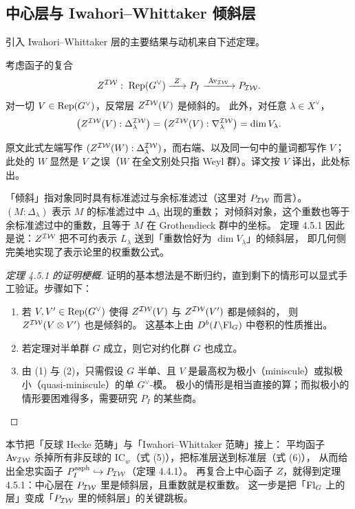 \subsection{中心层与 Iwahori–Whittaker 倾斜层}\label{sec:tilt}

引入 Iwahori–Whittaker 层的主要结果与动机来自下述定理。

\begin{theorem}\label{thm:tilt}
考虑函子的复合
\[
Z^{\IW}:\;\Rep(G^\vee)\xrightarrow{\ Z\ }P_I\xrightarrow{\ \AvIW\ }\PIW .
\]
对一切 $V\in\mathrm{Rep}(G^\vee)$，反常层 $Z^{\mathcal{IW}}(V)$ 是倾斜的。
此外，对任意 $\lambda\in X^\vee$，
\[
\bigl(Z^{\mathcal{IW}}(V):\Delta^{\mathcal{IW}}_\lambda\bigr)
=\bigl(Z^{\mathcal{IW}}(V):\nabla^{\mathcal{IW}}_\lambda\bigr)
=\dim V_\lambda .
\]
\end{theorem}

\begin{yizhu}[原文疑误]
原文此式左端写作 $(Z^{\mathcal{IW}}(W):\Delta^{\mathcal{IW}}_\lambda)$，而右端、以及同一句中的量词都写作 $V$；
此处的 $W$ 显然是 $V$ 之误（$W$ 在全文别处只指 Weyl 群）。译文按 $V$ 译出，此处标出。
\end{yizhu}

\begin{yizhu}
「倾斜」指对象同时具有标准滤过与余标准滤过（这里对 $P_{\mathcal{IW}}$ 而言）。
$(M:\Delta_\lambda)$ 表示 $M$ 的标准滤过中 $\Delta_\lambda$ 出现的重数；
对倾斜对象，这个重数也等于余标准滤过中的重数，且等于 $M$ 在 Grothendieck 群中的坐标。
定理 4.5.1 因此是说：$Z^{\mathcal{IW}}$ 把不可约表示 $L_\lambda$ 送到「重数恰好为 $\dim V_\lambda$」的倾斜层，
即几何侧完美地实现了表示论里的权重数公式。
\end{yizhu}

\begin{proof}[定理 4.5.1 的证明梗概]
证明的基本想法是不断归约，直到剩下的情形可以显式手工验证。步骤如下：
\begin{enumerate}[label=(\arabic*),leftmargin=2.2em,itemsep=1pt]
\item 若 $V,V'\in\mathrm{Rep}(G^\vee)$ 使得 $Z^{\mathcal{IW}}(V)$ 与 $Z^{\mathcal{IW}}(V')$ 都是倾斜的，
      则 $Z^{\mathcal{IW}}(V\otimes V')$ 也是倾斜的。
      这基本上由 $D^b(I\backslash\mathrm{Fl}_G)$ 中卷积的性质推出。
\item 若定理对半单群 $G$ 成立，则它对约化群 $G$ 也成立。
\item 由 (1) 与 (2)，只需假设 $G$ 半单、且 $V$ 是最高权为极小（miniscule）或拟极小（quasi-miniscule）的单 $G^\vee$-模。
      极小的情形是相当直接的算；而拟极小的情形要困难得多，需要研究 $P_I$ 的某些商。
\end{enumerate}
\end{proof}

\begin{keytakeaways}
本节把「反球 Hecke 范畴」与「Iwahori–Whittaker 范畴」接上：
平均函子 $\mathrm{Av}_{\mathcal{IW}}$ 杀掉所有非反球的 $\mathrm{IC}_w$（式 (5)），把标准层送到标准层（式 (6)），
从而给出全忠实函子 $P_I^{\mathrm{asph}}\hookrightarrow P_{\mathcal{IW}}$（定理 4.4.1）。
再复合上中心函子 $Z$，就得到定理 4.5.1：中心层在 $P_{\mathcal{IW}}$ 里是倾斜层，且重数就是权重数。
这一步是把「$\mathrm{Fl}_G$ 上的层」变成「$P_{\mathcal{IW}}$ 里的倾斜层」的关键跳板。
\end{keytakeaways}
